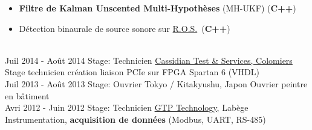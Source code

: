 \documentclass[letterpaper]{twentysecondcv} %
\newcommand{\ros}{\href{http://www.ros.org/}{R.O.S.}}
\begin{document}
\begin{twenty}
{    \begin{itemize}
    \item \textbf{Filtre de Kalman Unscented Multi-Hypothèses} (MH-UKF) (\textbf{C++})
    \item Détection binaurale de source sonore sur \ros\ (\textbf{C++})
    \end{itemize}
  }
  \\
  \twentyitem
  {Juil 2014 -}
  {Août 2014}
  {Stage: Technicien}
  {\href{http://www.spherea.com/fr}{Cassidian Test \& Services, Colomiers}}
  {
    Stage technicien création liaison PCIe sur FPGA Spartan 6 (VHDL)
  }
  \\
  \twentyitem
  {Juil 2013 -}
  {Août 2013}
  {Stage: Ouvrier}
  {Tokyo / Kitakyushu, Japon}
  {
    Ouvrier peintre en bâtiment
  }
  \\
  \twentyitem
  {Avri 2012 -}
  {Juin 2012}
  {Stage: Technicien}
  {\href{https://www.gtptech.com/}{GTP Technology}, Labège}
  {
    Instrumentation, \textbf{acquisition de données} (Modbus, UART, RS-485)
  }  
\end{twenty}
\end{document}
